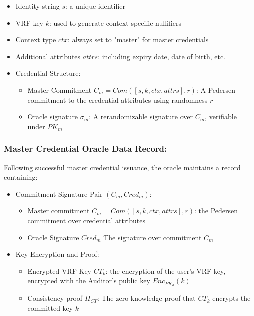 \begin{itemize}
    \item Identity string $s$: a unique identifier
    \item VRF key $k$: used to generate context-specific nullifiers
    \item Context type $ctx$: always set to "master" for master credentials
    \item Additional attributes $attrs$: including expiry date, date of birth, etc.
    \item Credential Structure:
    \begin{itemize}
        \item Master Commitment $C_m = Com([s, k, ctx, attrs],r)$: A Pedersen commitment to the credential attributes using randomness $r$
        \item Oracle signature $\sigma_m$: A rerandomizable signature over $C_m$, verifiable under $PK_m$
    \end{itemize}
\end{itemize}

\subsubsection{Master Credential Oracle Data Record:} Following successful master credential issuance, the oracle maintains a record containing:
\begin{itemize}
    \item Commitment-Signature Pair $(C_m, Cred_m)$:
    \begin{itemize}
        \item Master commitment $C_m = Com([s,k,ctx,attrs],r)$: the Pedersen commitment over credential attributes
        \item Oracle Signature $Cred_m$ The signature over commitment $C_m$
    \end{itemize}
    \item Key Encryption and Proof:
    \begin{itemize}
        \item Encrypted VRF Key $CT_k$: the encryption of the user's VRF key, encrypted with the Auditor's public key $Enc_{PK_a}(k)$
        \item Consistency proof $\Pi_{CT}$: The zero-knowledge proof that $CT_k$ encrypts the committed key $k$
    \end{itemize}
\end{itemize}


